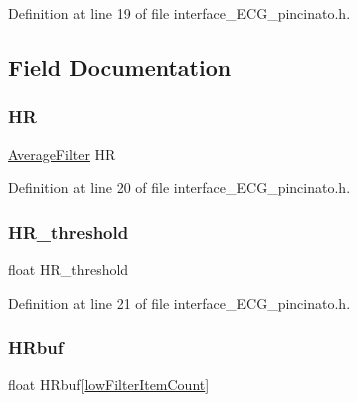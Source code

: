 Definition at line 19 of file interface\+\_\+\+E\+C\+G\+\_\+pincinato.\+h.



\subsection{Field Documentation}
\mbox{\label{struct_process_data_______afa7d4c3f6f59fcc62e758b829d298569}} 
\subsubsection{\texorpdfstring{HR}{HR}}
{\footnotesize\ttfamily \mbox{\hyperlink{filter__math__pincinato_8h_a05751bcbb0782121ff05ae3b7fc37dac}{Average\+Filter}} HR}



Definition at line 20 of file interface\+\_\+\+E\+C\+G\+\_\+pincinato.\+h.

\mbox{\label{struct_process_data_______aa85aa87ff25601cf758c39958653d60a}} 
\subsubsection{\texorpdfstring{H\+R\+\_\+threshold}{HR\_threshold}}
{\footnotesize\ttfamily float H\+R\+\_\+threshold}



Definition at line 21 of file interface\+\_\+\+E\+C\+G\+\_\+pincinato.\+h.

\mbox{\label{struct_process_data_______abe41d3213d4f1e10d1ce88c78db23a22}} 
\subsubsection{\texorpdfstring{H\+Rbuf}{HRbuf}}
{\footnotesize\ttfamily float H\+Rbuf\mbox{[}\mbox{\hyperlink{interface___e_c_g__pincinato_8h_aa57c4fd3ea06cc9a9c4e8ecda369ed58}{low\+Filter\+Item\+Count}}\mbox{]}}



